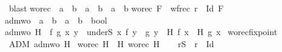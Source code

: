 \begin{isabellebody}
\ blast\isanewline
{}\isamarkupfalse%
%
\endisatagproof
{\isafoldproof}%
%
\isadelimproof
\isanewline
%
\endisadelimproof
\isanewline
{}\isamarkupfalse%
\isanewline
worec\ {\isacharcolon}{\kern0pt}{\isacharcolon}{\kern0pt}\ {\isachardoublequoteopen}{\isacharparenleft}{\kern0pt}{\isacharparenleft}{\kern0pt}{\isacharprime}{\kern0pt}a\ {\isasymRightarrow}\ {\isacharprime}{\kern0pt}b{\isacharparenright}{\kern0pt}\ {\isasymRightarrow}\ {\isacharprime}{\kern0pt}a\ {\isasymRightarrow}\ {\isacharprime}{\kern0pt}b{\isacharparenright}{\kern0pt}\ {\isasymRightarrow}\ {\isacharprime}{\kern0pt}a\ {\isasymRightarrow}\ {\isacharprime}{\kern0pt}b{\isachardoublequoteclose}\isanewline
{}\isanewline
{\isachardoublequoteopen}worec\ F\ {\isasymequiv}\ wfrec\ {\isacharparenleft}{\kern0pt}r\ {\isacharminus}{\kern0pt}\ Id{\isacharparenright}{\kern0pt}\ F{\isachardoublequoteclose}\isanewline
\isanewline
{}\isamarkupfalse%
\isanewline
adm{\isacharunderscore}{\kern0pt}wo\ {\isacharcolon}{\kern0pt}{\isacharcolon}{\kern0pt}\ {\isachardoublequoteopen}{\isacharparenleft}{\kern0pt}{\isacharparenleft}{\kern0pt}{\isacharprime}{\kern0pt}a\ {\isasymRightarrow}\ {\isacharprime}{\kern0pt}b{\isacharparenright}{\kern0pt}\ {\isasymRightarrow}\ {\isacharprime}{\kern0pt}a\ {\isasymRightarrow}\ {\isacharprime}{\kern0pt}b{\isacharparenright}{\kern0pt}\ {\isasymRightarrow}\ bool{\isachardoublequoteclose}\isanewline
{}\isanewline
{\isachardoublequoteopen}adm{\isacharunderscore}{\kern0pt}wo\ H\ {\isasymequiv}\ {\isasymforall}f\ g\ x{\isachardot}{\kern0pt}\ {\isacharparenleft}{\kern0pt}{\isasymforall}y\ {\isasymin}\ underS\ x{\isachardot}{\kern0pt}\ f\ y\ {\isacharequal}{\kern0pt}\ g\ y{\isacharparenright}{\kern0pt}\ {\isasymlongrightarrow}\ H\ f\ x\ {\isacharequal}{\kern0pt}\ H\ g\ x{\isachardoublequoteclose}\isanewline
\isanewline
{}\isamarkupfalse%
\ worec{\isacharunderscore}{\kern0pt}fixpoint{\isacharcolon}{\kern0pt}\isanewline
{}\ ADM{\isacharcolon}{\kern0pt}\ {\isachardoublequoteopen}adm{\isacharunderscore}{\kern0pt}wo\ H{\isachardoublequoteclose}\isanewline
{}\ {\isachardoublequoteopen}worec\ H\ {\isacharequal}{\kern0pt}\ H\ {\isacharparenleft}{\kern0pt}worec\ H{\isacharparenright}{\kern0pt}{\isachardoublequoteclose}\isanewline
%
\isadelimproof
%
\endisadelimproof
%
\isatagproof
{}\isamarkupfalse%
{\isacharminus}{\kern0pt}\isanewline
\ \ \isamarkupfalse%
\ {\isacharquery}{\kern0pt}rS\ {\isacharequal}{\kern0pt}\ {\isachardoublequoteopen}r\ {\isacharminus}{\kern0pt}\ Id{\isachardoublequoteclose}\isanewline

\end{isabellebody}
